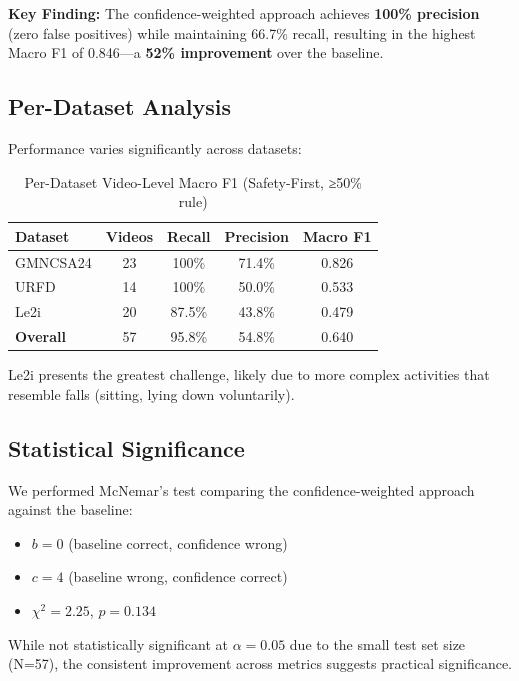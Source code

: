 \documentclass[conference]{IEEEtran}
\begin{document}
\textbf{Key Finding:} The confidence-weighted approach achieves \textbf{100\% precision} (zero false positives) while maintaining 66.7\% recall, resulting in the highest Macro F1 of 0.846—a \textbf{52\% improvement} over the baseline.

\subsection{Per-Dataset Analysis}

Performance varies significantly across datasets:

\begin{table}[h]
\centering
\caption{Per-Dataset Video-Level Macro F1 (Safety-First, ≥50\% rule)}
\label{tab:per_dataset}
\begin{tabular}{lcccc}
\toprule
\textbf{Dataset} & \textbf{Videos} & \textbf{Recall} & \textbf{Precision} & \textbf{Macro F1} \\
\midrule
GMNCSA24 & 23 & 100\% & 71.4\% & 0.826 \\
URFD & 14 & 100\% & 50.0\% & 0.533 \\
Le2i & 20 & 87.5\% & 43.8\% & 0.479 \\
\midrule
\textbf{Overall} & 57 & 95.8\% & 54.8\% & 0.640 \\
\bottomrule
\end{tabular}
\end{table}

Le2i presents the greatest challenge, likely due to more complex activities that resemble falls (sitting, lying down voluntarily).

\subsection{Statistical Significance}

We performed McNemar's test comparing the confidence-weighted approach against the baseline:
\begin{itemize}
    \item $b = 0$ (baseline correct, confidence wrong)
    \item $c = 4$ (baseline wrong, confidence correct)
    \item $\chi^2 = 2.25$, $p = 0.134$
\end{itemize}

While not statistically significant at $\alpha = 0.05$ due to the small test set size (N=57), the consistent improvement across metrics suggests practical significance.
\end{document}
